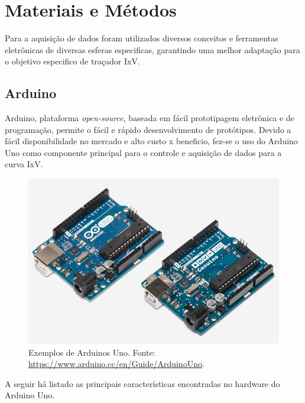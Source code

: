\chapter{Materiais e Métodos}
\label{cap:03}
Para a aquisição de dados foram utilizados diversos conceitos e ferramentas eletrônicas de diversas esferas especificas, garantindo uma melhor adaptação para o objetivo especifico de traçador IxV.

\section{Arduino}
Arduino, plataforma \textit{open-source}, baseada em fácil prototipagem eletrônica e de programação, permite o fácil e rápido desenvolvimento de protótipos. Devido a fácil disponibilidade no mercado e alto custo x beneficio, fez-se o uso do Arduino Uno como componente principal para o controle e aquisição de dados para a curva IxV.

\FloatBarrier
\begin{figure}[!htbp]
	\centering
	\includegraphics[scale=0.7]{imagens/Uno}
	\caption{Exemplos de Arduinos Uno. Fonte:  \url{https://www.arduino.cc/en/Guide/ArduinoUno}. }
	
	\label{fig:ArduinoUno}
\end{figure}
\FloatBarrier

A seguir há listado as principais características encontradas no hardware do Arduino Uno.

